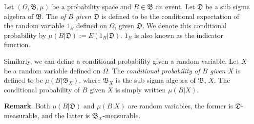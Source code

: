 \documentclass[12pt]{article}
\begin{document}
Let $(\Omega, \mathfrak{B}, \mu)$ be a probability space and $B\in \mathfrak{B}$ an event.  Let $\mathfrak{D}$ be a sub sigma algebra of $\mathfrak{B}$.  The \emph{ of $B$ given $\mathfrak{D}$} is defined to be the conditional expectation of the random variable $1_B$ defined on $\Omega$, given $\mathfrak{D}$.  We denote this conditional probability by $\mu(B|\mathfrak{D}):=E(1_B| \mathfrak{D})$.  $1_B$ is also known as the indicator function.  

Similarly, we can define a conditional probability given a random variable.  Let $X$ be a random variable defined on $\Omega$.  The \emph{conditional probability of $B$ given $X$} is defined to be $\mu(B|\mathfrak{B}_X)$, where $\mathfrak{B}_X$ is the sub sigma algebra of $\mathfrak{B}$,  $X$.  The conditional probability of $B$ given $X$ is simply written $\mu(B|X)$.

\textbf{Remark}.  Both $\mu(B|\mathfrak{D})$ and $\mu(B|X)$ are random variables, the former is $\mathfrak{D}$-measurable, and the latter is $\mathfrak{B}_X$-measurable.
\end{document}
